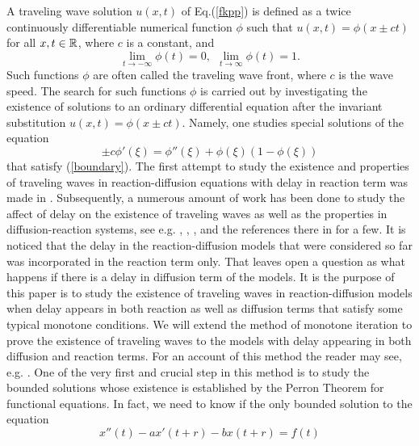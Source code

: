 \documentclass[12pt,letterpaper]{amsart}
\theoremstyle{definition}
\theoremstyle{remark}
\numberwithin{equation}{section}
\begin{document}
A traveling wave solution $u(x,t)$ of Eq.(\ref{fkpp}) is defined as a twice continuously differentiable numerical function $\phi $ such that $u(x,t)=\phi (x\pm ct)$ for all $x,t \in \mathbb R$, where $c$ is a constant, and 
\begin{equation}\label{boundary}
\lim_{t\to -\infty} \phi(t)=0, \ \ \lim_{t\to\infty} \phi(t)=1.
\end{equation}
Such functions $\phi$ are often called the traveling wave front, where $c$ is the wave speed. The search for such functions $\phi$ is carried out by investigating the existence of solutions to an ordinary differential equation after the invariant substitution $u(x,t)=\phi (x\pm ct)$. Namely, one studies special solutions of the equation
\begin{equation}
\pm c\phi '(\xi )= \phi ''(\xi )+\phi (\xi )(1-\phi (\xi ))
\end{equation}
that satisfy (\ref{boundary}). The first attempt to study the existence and properties of traveling waves in reaction-diffusion equations with delay in reaction term
was made in \cite{sch}. Subsequently, a numerous amount of work has been done to study the affect of delay on the existence of traveling waves as well as the properties in diffusion-reaction systems, see e.g. \cite{fanshashi}, \cite{liumeiyan}, \cite{ma}, \cite{vol} \cite{wuzou} and the references there in for a few. It is noticed that the delay in the reaction-diffusion models that were considered so far was incorporated in the reaction term only. That leaves open a question as what happens if there is a delay in diffusion term of the models. It is the purpose of this paper is to study the existence of traveling waves in reaction-diffusion models when delay appears in both reaction as well as diffusion terms that satisfy some typical monotone conditions.  We will extend the method of monotone iteration to prove the existence of traveling waves to the models with delay appearing in both diffusion and reaction terms. For an account of this method the reader may see, e.g. \cite{boumin,ma,wuzou}. One of the very first and crucial step in this method is to study the bounded solutions whose existence is established by the Perron Theorem for functional equations. In fact, we need to know if the only bounded solution to the equation
\begin{equation}\label{fde1}
x''(t)-ax'(t+r)-bx(t+r)=f(t)
\end{equation}
\end{document}
